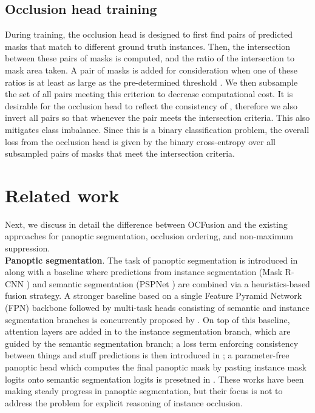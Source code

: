 \documentclass[10pt,twocolumn,letterpaper]{article}
\begin{document}
\subsection{Occlusion head training}

During training, the occlusion head is designed to first find pairs of predicted masks that match to different ground truth instances. Then, the intersection between these pairs of masks is computed, and the ratio of the intersection to mask area taken. A pair of masks is added for consideration when one of these ratios is at least as large as the pre-determined threshold . We then subsample the set of all pairs meeting this criterion to decrease computational cost. It is desirable for the occlusion head to reflect the consistency of , therefore we also invert all pairs so that  whenever the pair  meets the intersection criteria. This also mitigates class imbalance. Since this is a binary classification problem, the overall loss  from the occlusion head is given by the binary cross-entropy over all subsampled pairs of masks that meet the intersection criteria.


\section{Related work}
\label{sec:related_work}

Next, we discuss in detail the difference between OCFusion and the existing approaches for panoptic segmentation, occlusion ordering, and non-maximum suppression.\\

\noindent \textbf{Panoptic segmentation}. The task of panoptic segmentation is introduced in \cite{kirillov2018panoptic} along with a baseline where predictions from instance segmentation (Mask R-CNN \cite{he2017mask}) and semantic segmentation (PSPNet \cite{zhao2016pspnet}) are combined via a heuristics-based fusion strategy. A stronger baseline based on a single Feature Pyramid Network (FPN) \cite{FPN} backbone followed by multi-task heads consisting of semantic and instance segmentation branches is concurrently proposed by \cite{li2018attention, li2018learning, kirillov2019panoptic, xiong2019upsnet}. On top of this baseline,  attention layers are added in \cite{li2018attention} to the instance segmentation branch, which are guided by the semantic segmentation branch;  a loss term enforcing consistency between things and stuff predictions is then introduced in \cite{li2018learning};  a parameter-free panoptic head which computes the final panoptic mask by pasting instance mask logits onto semantic segmentation logits is presetned in \cite{xiong2019upsnet}. These works have been making steady progress in panoptic segmentation, but their focus is not to address the problem for explicit reasoning of instance occlusion.
\end{document}
